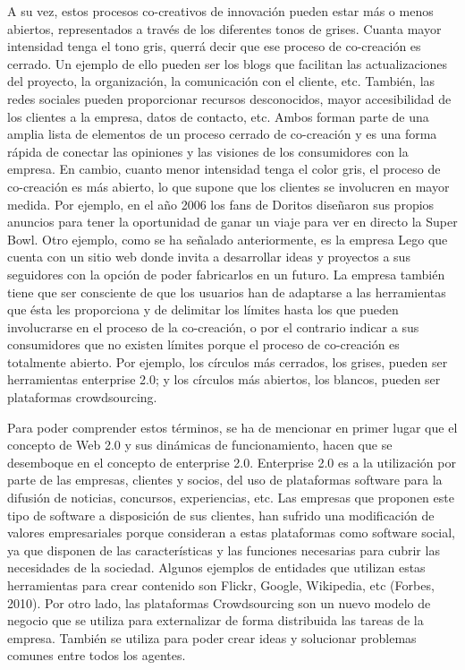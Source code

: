 A su vez, estos procesos co-creativos de innovación pueden estar más o menos abiertos, representados a través de los diferentes tonos de grises. Cuanta mayor intensidad tenga el tono gris, querrá decir que ese proceso de co-creación es cerrado. Un ejemplo de ello pueden ser los blogs que facilitan las actualizaciones del proyecto, la organización, la comunicación con el cliente, etc. También, las redes sociales pueden proporcionar recursos desconocidos, mayor accesibilidad de los clientes a la empresa, datos de contacto, etc. Ambos forman parte de una amplia lista de elementos de un proceso cerrado de co-creación y es una forma rápida de conectar las opiniones y las visiones de los consumidores con la empresa. En cambio, cuanto menor intensidad tenga el color gris, el proceso de co-creación es más abierto, lo que supone que los clientes se involucren en mayor medida. Por ejemplo, en el año 2006 los fans de Doritos diseñaron sus propios anuncios para tener la oportunidad de ganar un viaje para ver en directo la Super Bowl. Otro ejemplo, como se ha señalado anteriormente, es la empresa Lego que cuenta con un sitio web donde invita a desarrollar ideas y proyectos a sus seguidores con la opción de poder fabricarlos en un futuro. La empresa también tiene que ser consciente de que los usuarios han de adaptarse a las herramientas que ésta les proporciona y de delimitar los límites hasta los que pueden involucrarse en el proceso de la co-creación, o por el contrario indicar a sus consumidores que no existen límites porque el proceso de co-creación es totalmente abierto. Por ejemplo, los círculos más cerrados, los grises, pueden ser herramientas enterprise 2.0; y los círculos más abiertos, los blancos, pueden ser plataformas crowdsourcing.

Para poder comprender estos términos, se ha de mencionar en primer lugar que el concepto de Web 2.0 y sus dinámicas de funcionamiento, hacen que se desemboque en el concepto de enterprise 2.0. Enterprise 2.0 es a la utilización por parte de las empresas, clientes y socios, del uso de plataformas software para la difusión de noticias, concursos, experiencias, etc. Las empresas que proponen este tipo de software a disposición de sus clientes, han sufrido una modificación de valores empresariales porque consideran a estas plataformas como software social, ya que disponen de las características y las funciones necesarias para cubrir las necesidades de la sociedad. Algunos ejemplos de entidades que utilizan estas herramientas para crear contenido son Flickr, Google, Wikipedia, etc (Forbes, 2010). Por otro lado, las plataformas Crowdsourcing son un nuevo modelo de negocio que se utiliza para externalizar de forma distribuida las tareas de la empresa. También se utiliza para poder crear ideas y solucionar problemas comunes entre todos los agentes.

